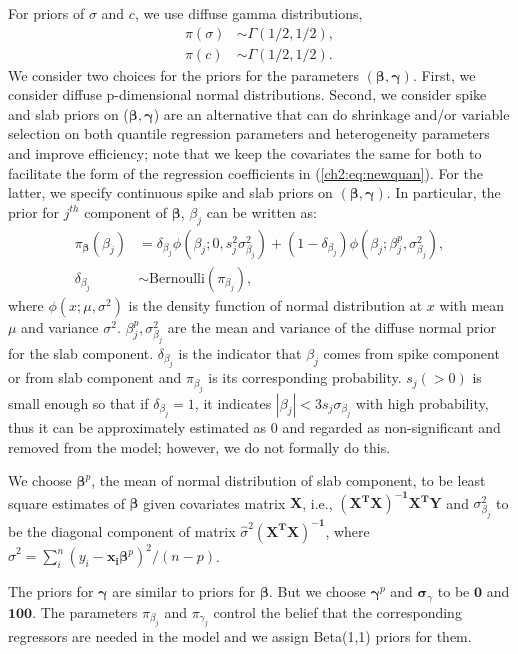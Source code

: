\documentclass[12pt]{article}
\begin{document}
For priors of $\sigma$ and $c$, we use diffuse gamma distributions,
\begin{align*}
  \pi(\sigma) & \sim \Gamma (1/2, 1/2), \\
  \pi(c) & \sim \Gamma(1/2, 1/2).
\end{align*}
We consider two choices for the priors for the parameters
$(\bm{\beta}, \bm{\gamma})$.  First, we consider diffuse p-dimensional
normal distributions.  Second, we consider spike and slab priors on
($\bm \beta, \bm \gamma$) are an alternative that can do shrinkage
and/or variable selection on both quantile regression parameters and
heterogeneity parameters and improve efficiency; note that we keep the
covariates the same for both to facilitate the form of the regression
coefficients in (\ref{ch2:eq:newquan}).  For the latter, we specify
continuous spike and slab priors \citep{george1993}
on $(\bm \beta, \bm
\gamma)$. In particular, the prior for
$j^{th}$ component of $\bm \beta$, $\beta_j$
can be written as:
\begin{align*}
  \pi_{\bm \beta} (\beta_j) &= \delta_{\beta_j} \phi(\beta_j; 0, s_j^2
  \sigma_{\beta_j}^2) +
  (1- \delta_{\beta_j}) \phi(\beta_j; \beta_j^p, \sigma_{\beta_j}^2),\\
  \delta_{\beta_j} & \sim \mbox{Bernoulli} (\pi_{\beta_j}),
\end{align*}
where $\phi(x; \mu, \sigma^2)$ is the density function of normal
distribution at $x$ with mean $\mu$ and variance
$\sigma^2$. $\beta_j^p, \sigma_{\beta_j}^2$ are the mean and variance
of the diffuse normal prior for the slab component.
$\delta_{\beta_j}$ is the indicator that $\beta_j$ comes from spike
component or from slab component and $\pi_{\beta_j}$ is its corresponding
probability.  $s_j (>0)$ is small enough so that if $\delta_{\beta_j}
= 1$, it indicates $|\beta_j | < 3 s_j\sigma_{\beta_j}$ with high
probability, thus it can be approximately estimated as 0 and regarded
as non-significant and removed from the model; however, we do not formally do this.

We choose $\bm \beta^p$, the mean of normal distribution of slab
component, to be least square estimates of $\bm \beta$ given covariates
matrix $\bm X$, i.e., $\bm{(X^TX)^{-1}X^TY}$ and
$\sigma_{\beta_j}^2$ to be the diagonal component of matrix
$\hat{\sigma}^2 \bm{(X^TX)^{-1}}$, where $\hat{\sigma}^2 = \sum_i^n
(y_i - \bm{x_i\beta}^p)^2/(n - p)$.

The priors for $\bm \gamma$ are similar to priors for $\bm \beta$. But
we choose $\bm \gamma^p$ and $\bm \sigma_{\gamma}$ to be $\bm 0$ and
$\bm{100}$.
The parameters $\pi_{\beta_j}$ and $\pi_{\gamma_j}$ control the belief that the
corresponding regressors are needed in the model and
we assign Beta(1,1) priors for them.
\end{document}
